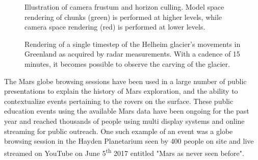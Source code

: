 \documentclass[journal]{vgtc}                %
\begin{document}
\begin{figure}[t!]
    \centering
        \caption{Illustration of camera frustum and horizon culling. Model space rendering of chunks (green) is performed at higher levels, while camera space rendering (red) is performed at lower levels.}
    \label{fig:frustum_mars}\vspace*{-4mm}
\end{figure}

\begin{figure}[b!]\vspace*{-4mm}
    \centering
        \caption{Rendering of a single timestep of the Helheim glacier's movements in Greenland as acquired by radar measurements. With a cadence of 15 minutes, it becomes possible to observe the carving of the glacier.}
    \label{fig:glacier}
\end{figure}

The Mars globe browsing sessions have been used in a large number of public presentations to explain the history of Mars exploration, and the ability to contextualize events pertaining to the rovers on the surface.
These public education events using the available Mars data have been ongoing for the past year and reached thousands of people using multi display systems and online streaming for public outreach. One such example of an event was a globe browsing session in the Hayden Planetarium seen by 400 people on site and live streamed on YouTube on June 5\textsuperscript{th} 2017 entitled "Mars as never seen before".
\end{document}
